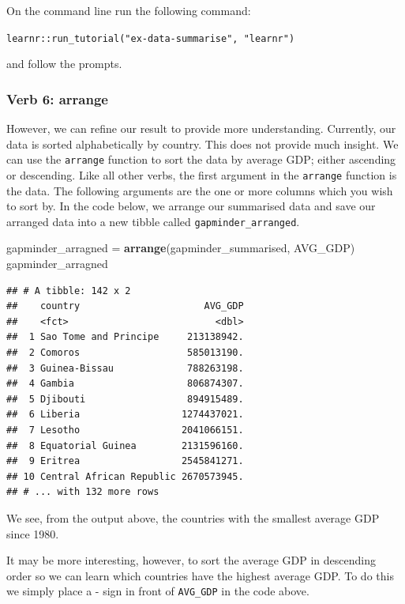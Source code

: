\documentclass[]{book}
\newenvironment{Shaded}{\begin{snugshade}}{\end{snugshade}}
\newcommand{\KeywordTok}[1]{\textcolor[rgb]{0.13,0.29,0.53}{\textbf{#1}}}
\newcommand{\NormalTok}[1]{#1}
\newcommand{\StringTok}[1]{\textcolor[rgb]{0.31,0.60,0.02}{#1}}
\begin{document}
On the command line run the following command:

\texttt{learnr::run\_tutorial("ex-data-summarise",\ "learnr")}

and follow the prompts.

\hypertarget{verb-6-arrange}{%
\subsubsection{Verb 6: arrange}\label{verb-6-arrange}}

However, we can refine our result to provide more understanding. Currently, our data is sorted alphabetically by country. This does not provide much insight. We can use the \texttt{arrange} function to sort the data by average GDP; either ascending or descending. Like all other verbs, the first argument in the \texttt{arrange} function is the data. The following arguments are the one or more columns which you wish to sort by. In the code below, we arrange our summarised data and save our arranged data into a new tibble called \texttt{gapminder\_arranged}.

\begin{Shaded}
\begin{Highlighting}[]
\NormalTok{gapminder_arragned =}\StringTok{ }\KeywordTok{arrange}\NormalTok{(gapminder_summarised, AVG_GDP)}
\NormalTok{gapminder_arragned}
\end{Highlighting}
\end{Shaded}

\begin{verbatim}
## # A tibble: 142 x 2
##    country                      AVG_GDP
##    <fct>                          <dbl>
##  1 Sao Tome and Principe     213138942.
##  2 Comoros                   585013190.
##  3 Guinea-Bissau             788263198.
##  4 Gambia                    806874307.
##  5 Djibouti                  894915489.
##  6 Liberia                  1274437021.
##  7 Lesotho                  2041066151.
##  8 Equatorial Guinea        2131596160.
##  9 Eritrea                  2545841271.
## 10 Central African Republic 2670573945.
## # ... with 132 more rows
\end{verbatim}

We see, from the output above, the countries with the smallest average GDP since 1980.

It may be more interesting, however, to sort the average GDP in descending order so we can learn which countries have the highest average GDP. To do this we simply place a - sign in front of \texttt{AVG\_GDP} in the code above.
\end{document}
